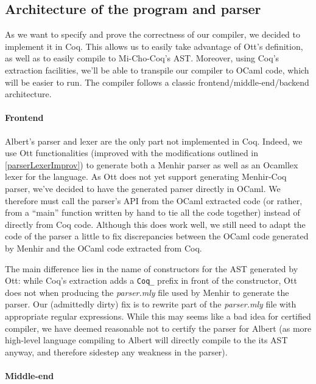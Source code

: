 \documentclass{report}
\begin{document}
\subsection{Architecture of the program and parser}

As we want to specify and prove the correctness of our compiler, we decided to implement it in Coq. This allows us to easily take advantage of Ott's definition, as well as to easily compile to Mi-Cho-Coq's AST. Moreover, using Coq's extraction facilities, we'll be able to transpile our compiler to OCaml code, which will be easier to run. The compiler follows a classic frontend/middle-end/backend architecture.

\paragraph{Frontend}

Albert's parser and lexer are the only part not implemented in Coq. Indeed, we use Ott functionalities (improved with the modifications outlined in \ref{parserLexerImprov}) to generate both a Menhir parser as well as an Ocamllex lexer for the language. As Ott does not yet support generating Menhir-Coq parser, we've decided to have the generated parser directly in OCaml. We therefore must call the parser's API from the OCaml extracted code (or rather, from a ``main'' function written by hand to tie all the code together) instead of directly from Coq code. Although this does work well, we still need to adapt the code of the parser a little to fix discrepancies between the OCaml code generated by Menhir and the OCaml code extracted from Coq.

The main difference lies in the name of constructors for the AST generated by Ott: while Coq's extraction adds a \texttt{Coq\_} prefix in front of the constructor, Ott does not when producing the \textit{parser.mly} file used by Menhir to generate the parser. Our (admittedly dirty) fix is to rewrite part of the \textit{parser.mly} file with appropriate regular expressions. While this may seems like a bad idea for certified compiler, we have deemed reasonable not to certify the parser for Albert (as more high-level language compiling to Albert will directly compile to the its AST anyway, and therefore sidestep any weakness in the parser).

\paragraph{Middle-end}
\end{document}
